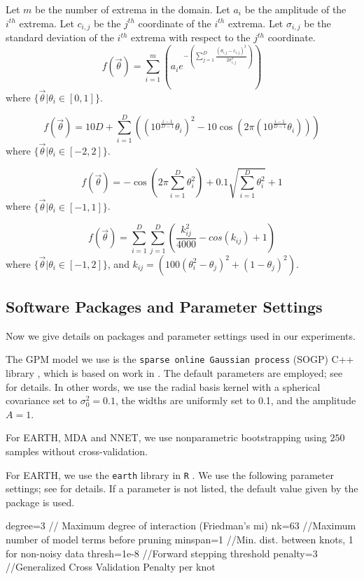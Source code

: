 Let $m$ be the number of extrema in the domain.
Let $a_i$ be the amplitude of the $i^{th}$ extrema.
Let $c_{i,j}$ be the $j^{th}$ coordinate of the $i^{th}$ extrema.
Let $\sigma_{i,j}$ be the standard deviation of the $i^{th}$ extrema with respect to the  $j^{th}$ coordinate.
$$
f(\vec{\theta}) = \sum_{i=1}^{m}\left(a_i e^{-\left(\sum_{j=1}^{D}\frac{\left(\theta_{i,j}-c_{i,j}\right)^2}{2\sigma_{i,j}^2}\right)}\right)
$$
where $\{\vec{\theta}|\theta_i\in [0,1]\}$.


$$
f(\vec{\theta}) = 10D + \sum_{i=1}^{D}\left((10^{\frac{i-1}{D-1}}\theta_i)^2 - 10\cos(2\pi(10^{\frac{i-1}{D-1}}\theta_i))\right)
$$
where
$\{\vec{\theta}|\theta_i\in [-2,2]\}$.


$$
f(\vec{\theta}) = -\cos\left(2\pi\sum_{i=1}^D\theta_i^2\right) + 0.1\sqrt{\sum_{i=1}^D\theta_i^2} + 1
$$
where $\{\vec{\theta}|\theta_i\in [-1,1]\}$.

$$
f(\vec{\theta}) = \sum_{i=1}^{D}\sum_{j=1}^{D}\left(\frac{k_{ij}^2}{4000} - cos(k_{ij}) + 1\right)
$$
where $\{\vec{\theta}|\theta_i\in [-1,2]\}$, and
$k_{ij} = (100(\theta_i^2-\theta_j)^2 + (1-\theta_j)^2)$.

\subsection{Software Packages and Parameter Settings}
\label{sec:package}

Now we give details on packages and parameter settings used in our experiments.

The GPM model we use is the \texttt{sparse online Gaussian process} (SOGP) C++ library \cite{gpm}, which is based on work in \cite{Csato2002,CsatoOpper2002}.
%
The default parameters are employed; see~\cite{CsatoOpper2002} for details.
%
In other words, we use the radial basis kernel with a spherical covariance set to $\sigma_0^2 = 0.1$, the widths are uniformly set to 0.1, and the amplitude $A=1$.

For EARTH, MDA and NNET, we use nonparametric bootstrapping using $250$ samples without cross-validation.

For EARTH, we use the \texttt{earth} library in \texttt{R} \cite{earth}.
%
We use the following parameter settings; see \cite{earth} for details.
%
If a parameter is not listed, the default value given by the package is used.
%
\begin{code}
degree=3 // Maximum degree of interaction (Friedman's mi)
nk=63  //Maximum number of model terms before pruning
minspan=1 //Min. dist. between knots, 1 for non-noisy data
thresh=1e-8  //Forward stepping threshold
penalty=3 //Generalized Cross Validation Penalty per knot
\end{code}

